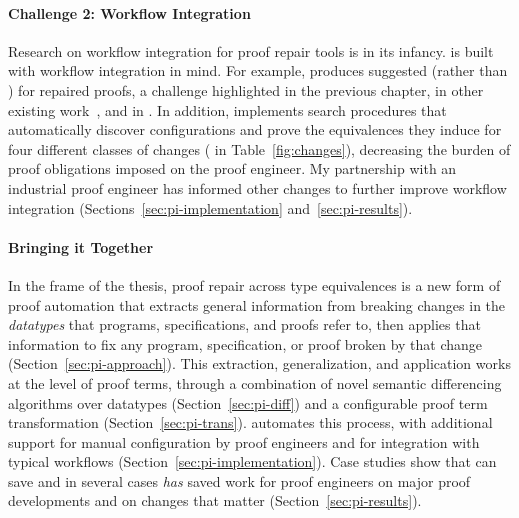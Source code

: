 \paragraph{Challenge 2: Workflow Integration}
Research on workflow integration for proof repair tools is in its infancy.
\toolnamec is built with workflow integration in mind.
For example, \toolnamec produces suggested  (rather than ) for repaired proofs,
a challenge highlighted in the previous chapter, in other existing work~\cite{robert2018}, and in .
In addition, \toolnamec implements search procedures that 
automatically discover configurations and prove the equivalences they induce for four different classes of 
changes ( in Table~\ref{fig:changes}),
decreasing the burden of proof obligations imposed on the proof engineer.
My partnership with an industrial proof engineer has informed other changes to further improve workflow integration
(Sections~\ref{sec:pi-implementation} and~\ref{sec:pi-results}).

\paragraph{Bringing it Together}
In the frame of the thesis, proof repair across type equivalences is a new form of proof automation that extracts general information from breaking 
changes in the \textit{datatypes} that programs, specifications, and proofs refer to, 
then applies that information to fix any program, specification, or proof broken by that change (Section~\ref{sec:pi-approach}).
This extraction, generalization, and application works at the level of proof terms, through a combination of novel semantic differencing algorithms over datatypes (Section~\ref{sec:pi-diff}) and a configurable proof term transformation (Section~\ref{sec:pi-trans}).
\toolnamec automates this process,
with additional support for manual configuration by proof engineers and for integration with 
typical  workflows (Section~\ref{sec:pi-implementation}).
Case studies show that \toolnamec can save and in several cases \textit{has} saved work for proof engineers on major proof developments and on
changes that matter (Section~\ref{sec:pi-results}).















